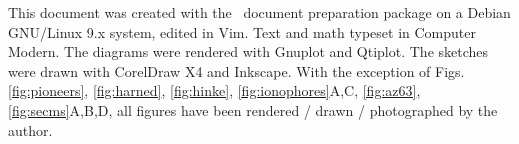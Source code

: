 \newpage
This document was created with the \LaTeXe \, document preparation package on a Debian GNU/Linux 9.x system, edited in Vim. Text and math typeset in Computer Modern.
The diagrams were rendered with Gnuplot and Qtiplot.
The sketches were drawn with CorelDraw X4 and Inkscape.
With the exception of Figs. \ref{fig:pioneers}, \ref{fig:harned}, \ref{fig:hinke}, \ref{fig:ionophores}A,C, \ref{fig:az63}, \ref{fig:secms}A,B,D, all figures have been rendered / drawn / photographed by the author.
